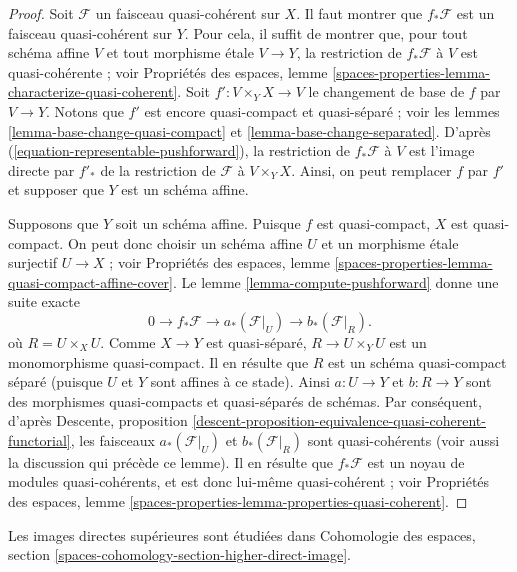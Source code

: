 \begin{proof}
Soit $\mathcal{F}$ un faisceau quasi-cohérent sur $X$. Il faut montrer que
$f_*\mathcal{F}$ est un faisceau quasi-cohérent sur $Y$. Pour cela, il suffit
de montrer que, pour tout schéma affine $V$ et tout morphisme \'etale $V \to Y$,
la restriction de $f_*\mathcal{F}$ à $V$ est quasi-cohérente ; voir
Propriétés des espaces,
lemme \ref{spaces-properties-lemma-characterize-quasi-coherent}.
Soit $f' : V \times_Y X \to V$
le changement de base de $f$ par $V \to Y$. Notons que $f'$ est encore
quasi-compact et quasi-séparé ; voir les
lemmes \ref{lemma-base-change-quasi-compact} et
\ref{lemma-base-change-separated}.
D'après (\ref{equation-representable-pushforward}),
la restriction de $f_*\mathcal{F}$ à $V$ est l'image directe par $f'_*$ de la
restriction de $\mathcal{F}$ à $V \times_Y X$. Ainsi,
on peut remplacer $f$ par $f'$ et supposer que $Y$ est un schéma affine.

\medskip\noindent
Supposons que $Y$ soit un schéma affine. Puisque $f$ est quasi-compact, $X$
est quasi-compact. On peut donc choisir un schéma affine $U$ et un morphisme
\'etale surjectif $U \to X$ ; voir
Propriétés des espaces,
lemme \ref{spaces-properties-lemma-quasi-compact-affine-cover}.
Le lemme \ref{lemma-compute-pushforward} donne une suite exacte
$$
0 \to f_*\mathcal{F} \to a_*(\mathcal{F}|_U) \to b_*(\mathcal{F}|_R).
$$
où $R = U \times_X U$.
Comme $X \to Y$ est quasi-séparé, $R \to U \times_Y U$
est un monomorphisme quasi-compact. Il en résulte que $R$ est un schéma
quasi-compact séparé (puisque $U$ et $Y$ sont affines à ce stade).
Ainsi $a : U \to Y$ et $b : R \to Y$ sont des morphismes quasi-compacts et
quasi-séparés de schémas. Par conséquent, d'après
Descente,
proposition \ref{descent-proposition-equivalence-quasi-coherent-functorial},
les faisceaux $a_*(\mathcal{F}|_U)$ et $b_*(\mathcal{F}|_R)$
sont quasi-cohérents (voir aussi la discussion qui précède ce lemme).
Il en résulte que $f_*\mathcal{F}$ est un noyau de
modules quasi-cohérents, et est donc lui-même quasi-cohérent ; voir
Propriétés des espaces,
lemme \ref{spaces-properties-lemma-properties-quasi-coherent}.
\end{proof}

\noindent
Les images directes supérieures sont étudiées dans
Cohomologie des espaces, section
\ref{spaces-cohomology-section-higher-direct-image}.









